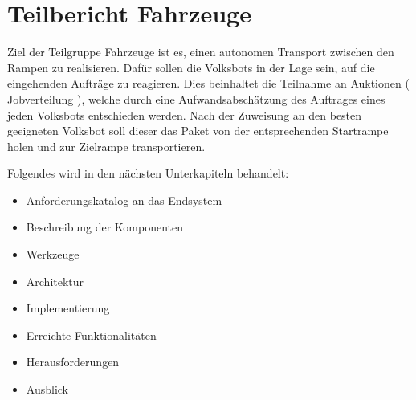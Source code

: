 \section{Teilbericht Fahrzeuge}

Ziel der Teilgruppe Fahrzeuge ist es, einen autonomen Transport zwischen den Rampen zu realisieren. Dafür sollen die Volksbots in der Lage sein, auf die eingehenden Aufträge zu reagieren.
Dies beinhaltet die Teilnahme an Auktionen ( Jobverteilung ), welche durch eine Aufwandsabschätzung des Auftrages eines jeden Volksbots entschieden werden. Nach der Zuweisung an den besten geeigneten Volksbot soll dieser das Paket von der entsprechenden Startrampe holen und zur Zielrampe transportieren.

Folgendes wird in den nächsten Unterkapiteln behandelt:

\begin{itemize}
	\item Anforderungskatalog an das Endsystem
	\item Beschreibung der Komponenten
	\item Werkzeuge
	\item Architektur
	\item Implementierung
	\item Erreichte Funktionalitäten
	\item Herausforderungen
	\item Ausblick
\end{itemize} 



































